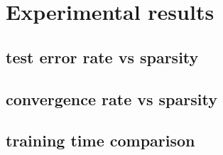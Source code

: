 \documentclass{article}
\begin{document}
\section{Experimental results}
\subsection{test error rate vs sparsity}
\subsection{convergence rate vs sparsity}
\subsection{training time comparison}
\end{document}
